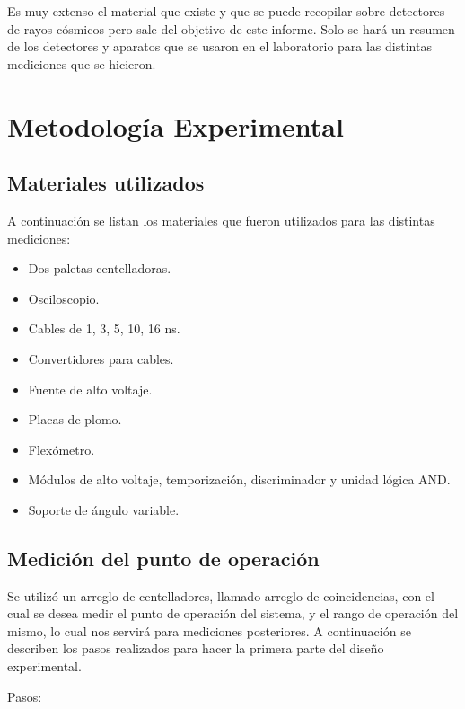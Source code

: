 \documentclass[a4paper,10pt]{article}
\numberwithin{equation}{section}
\begin{document}
Es muy extenso el material que existe y que se puede recopilar sobre detectores de 
rayos cósmicos pero sale del objetivo de este informe. Solo se hará un resumen de los 
detectores y aparatos que se usaron en el laboratorio para las distintas mediciones 
que se hicieron.

\section{Metodología Experimental}

\subsection{Materiales utilizados}

A continuación se listan los materiales que fueron utilizados para las distintas mediciones:

\begin{itemize}
 \item Dos paletas centelladoras.
 \item Osciloscopio.
 \item Cables de 1, 3, 5, 10, 16 ns.
 \item Convertidores para cables.
 \item Fuente de alto voltaje.
 \item Placas de plomo.
 \item Flexómetro.
 \item Módulos de alto voltaje, temporización, discriminador y unidad lógica AND.
 \item Soporte de ángulo variable.
\end{itemize}


\subsection{Medición del punto de operación}



Se utilizó un arreglo de centelladores, llamado arreglo de coincidencias, con el cual se desea medir el punto de operación del sistema, y el rango de operación del mismo, 
lo cual nos servirá para mediciones posteriores. A continuación se describen los 
pasos realizados para hacer la primera parte del diseño experimental.

\vspace{.3cm}

Pasos:
\end{document}
